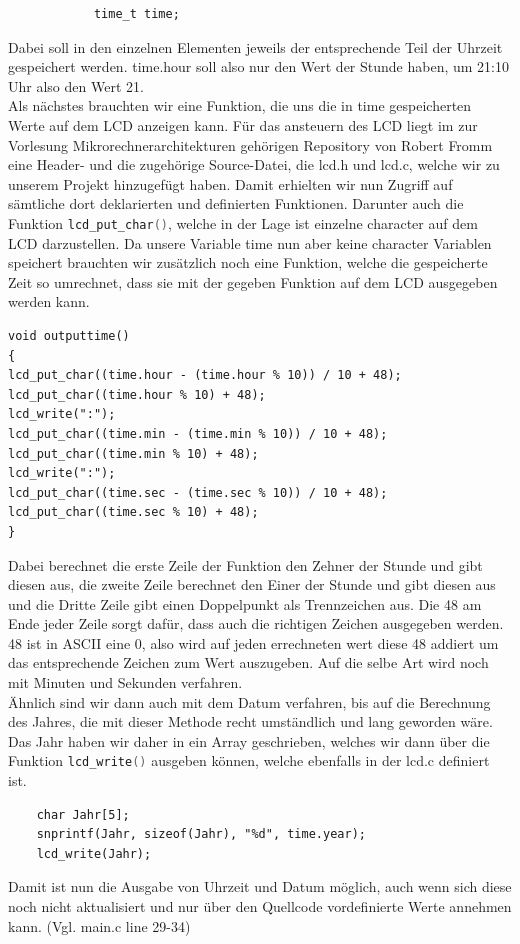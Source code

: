\documentclass[openright,twoside,11pt,a4paper]{scrartcl}
\begin{document}
\begin{flushleft}
\begin{lstlisting}
			time_t time;
		\end{lstlisting}
		Dabei soll in den einzelnen Elementen jeweils der entsprechende Teil der Uhrzeit gespeichert werden. time.hour soll also nur den Wert der Stunde haben, um 21:10 Uhr also den 				Wert 21.\\
		Als nächstes brauchten wir eine Funktion, die uns die in time gespeicherten Werte auf dem LCD anzeigen kann. Für das ansteuern des LCD liegt im zur Vorlesung Mikrorechnerarchitekturen gehörigen Repository von Robert Fromm eine Header- und die zugehörige Source-Datei, die lcd.h und lcd.c, welche wir zu unserem Projekt hinzugefügt haben. Damit erhielten wir nun Zugriff auf sämtliche dort deklarierten und definierten Funktionen. Darunter auch die Funktion \lstinline[language=C++]|lcd_put_char()|, welche in der Lage ist einzelne  character auf dem LCD darzustellen. Da unsere Variable time nun aber keine character Variablen speichert brauchten wir zusätzlich noch eine Funktion, welche die gespeicherte Zeit so umrechnet, dass sie mit der gegeben Funktion auf dem LCD ausgegeben werden kann. 
		\begin{lstlisting}
void outputtime()
{
lcd_put_char((time.hour - (time.hour % 10)) / 10 + 48);
lcd_put_char((time.hour % 10) + 48);
lcd_write(":");
lcd_put_char((time.min - (time.min % 10)) / 10 + 48);
lcd_put_char((time.min % 10) + 48);
lcd_write(":");
lcd_put_char((time.sec - (time.sec % 10)) / 10 + 48);
lcd_put_char((time.sec % 10) + 48);
}
		\end{lstlisting}
		Dabei berechnet die erste Zeile der Funktion den Zehner der Stunde und gibt diesen aus, die zweite Zeile berechnet den Einer der Stunde und gibt diesen aus und die Dritte Zeile gibt einen Doppelpunkt als Trennzeichen aus. Die 48 am Ende jeder Zeile sorgt dafür, dass auch die richtigen Zeichen ausgegeben werden. 48 ist in ASCII eine 0, also wird auf jeden errechneten wert diese 48 addiert um das entsprechende Zeichen zum Wert auszugeben. Auf die selbe Art wird noch mit Minuten und Sekunden verfahren.\\
		Ähnlich sind wir dann auch mit dem Datum verfahren, bis auf die Berechnung des Jahres, die mit dieser Methode recht umständlich und lang geworden wäre. Das Jahr haben wir daher in ein Array geschrieben, welches wir dann über die Funktion \lstinline[language=c++]|lcd_write()| ausgeben können, welche ebenfalls in der lcd.c definiert ist. \\
		\begin{lstlisting}
 	char Jahr[5];
	snprintf(Jahr, sizeof(Jahr), "%d", time.year);
	lcd_write(Jahr);
		\end{lstlisting}
		Damit ist nun die Ausgabe von Uhrzeit und Datum möglich, auch wenn sich diese noch nicht aktualisiert und nur über den Quellcode vordefinierte Werte annehmen kann. (Vgl. main.c line 29-34)
		

\end{flushleft}
\end{document}

